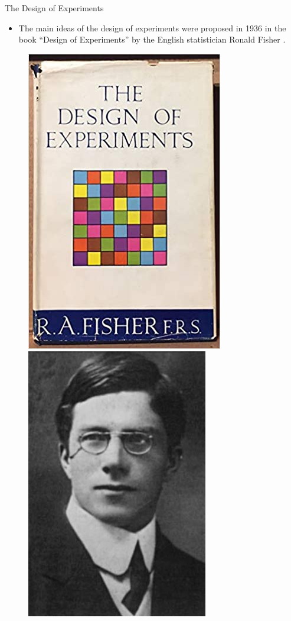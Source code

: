 \documentclass[handout]{beamer}
\begin{document}
\begin{frame}{The Design of Experiments}
\scriptsize{

\begin{itemize}

\item The main ideas of the design of experiments were proposed in 1936 in the book ``Design of Experiments'' by the English statistician Ronald Fisher
\cite{fisher1936design}.
 
 
 
\end{itemize}

\begin{figure}[h!]
	\centering
	\includegraphics[scale=0.3]{pics/experFish.jpg}
	\includegraphics[scale=0.3]{pics/RonaldFisher1912.jpg}	
\end{figure}



} 
\end{frame}
\end{document}
